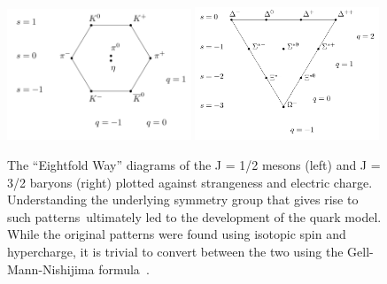 \begin{figure}[t!]
    \centering
    \includegraphics[width=0.49\textwidth]{figures/introduction/Meson_octet.png}
    \includegraphics[width=0.49\textwidth]{figures/introduction/Baryon_decuplet.png}
    \caption{The ``Eightfold Way'' diagrams of the J = 1/2 mesons (left) and J = 3/2 baryons (right) plotted against strangeness and electric charge. Understanding the underlying symmetry group that gives rise to such patterns\protect\footnotemark \  ultimately led to the development of the quark model. While the original patterns were found using isotopic spin and hypercharge, it is trivial to convert between the two using the Gell-Mann-Nishijima formula~\cite{GellMannNishijima_1, GellMannNishijima_2}.}
    \label{fig:eightfold_way}
\end{figure}
%
